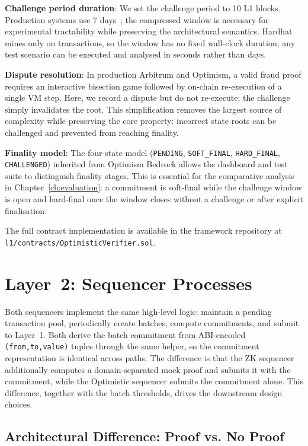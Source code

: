 \textbf{Challenge period duration}: We set the challenge period to 10 L1 blocks. Production systems use 7 days~\cite{arbitrum-original}; the compressed window is necessary for experimental tractability while preserving the architectural semantics. Hardhat mines only on transactions, so the window has no fixed wall-clock duration; any test scenario can be executed and analysed in seconds rather than days.

\textbf{Dispute resolution}: In production Arbitrum and Optimism, a valid fraud proof requires an interactive bisection game followed by on-chain re-execution of a single VM step. Here, we record a dispute but do not re-execute; the challenge simply invalidates the root. This simplification removes the largest source of complexity while preserving the core property: incorrect state roots can be challenged and prevented from reaching finality.

\textbf{Finality model}: The four-state model (\texttt{PENDING}, \texttt{SOFT\_FINAL}, \texttt{HARD\_FINAL}, \texttt{CHALLENGED}) inherited from Optimism Bedrock allows the dashboard and test suite to distinguish finality stages. This is essential for the comparative analysis in Chapter~\ref{ch:evaluation}: a commitment is soft-final while the challenge window is open and hard-final once the window closes without a challenge or after explicit finalisation.

The full contract implementation is available in the framework repository at \texttt{l1/contracts/OptimisticVerifier.sol}.

\section{Layer~2: Sequencer Processes}
\label{sec:l2-design}

Both sequencers implement the same high-level logic: maintain a pending transaction pool, periodically create batches, compute commitments, and submit to Layer~1. Both derive the batch commitment from ABI-encoded \texttt{(from,to,value)} tuples through the same helper, so the commitment representation is identical across paths. The difference is that the ZK sequencer additionally computes a domain-separated mock proof and submits it with the commitment, while the Optimistic sequencer submits the commitment alone. This difference, together with the batch thresholds, drives the downstream design choices.

\subsection{Architectural Difference: Proof vs. No Proof}

